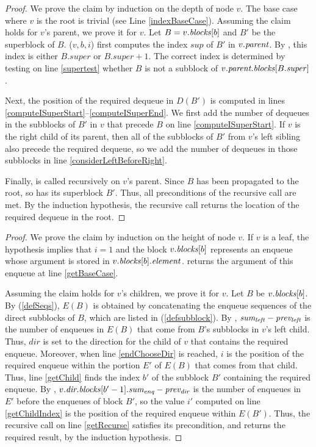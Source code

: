 \indexDequeueRes*
\begin{proof}
We prove the claim by induction on the depth of node $v$. The base case where $v$ is the root is trivial (see Line \ref{indexBaseCase}).
Assuming the claim holds for $v$'s parent, we prove it for $v$.
Let $B=v.\mbox{\textit{blocks}}[b]$ and $B'$ be the superblock of $B$.
($v, b, i$) first computes the index $sup$ of $B'$ in $v.\mbox{\textit{parent}}$.
By , this index is either $B.super$ or $B.super+1$.
The correct index is determined by testing on line \ref{supertest} whether $B$ is not a subblock of $v.\mbox{\textit{parent.blocks}}[B.\mbox{\textit{super}}]$.

Next, the position of the required dequeue in $D(B')$ is computed in 
lines \ref{computeISuperStart}--\ref{computeISuperEnd}. 
We first add the number of dequeues in the subblocks of $B'$ in $v$ that precede $B$ on line \ref{computeISuperStart}.
If $v$ is the right child of its parent, then all of the subblocks of $B'$ from $v$'s left sibling
also precede the required dequeue, so we add the number of dequeues in those subblocks in line \ref{considerLeftBeforeRight}.

Finally,  is called recursively on $v$'s parent.
Since $B$ has been propagated to the root, so has its superblock $B'$.
Thus, all preconditions of the recursive call are met.
By the induction hypothesis, the recursive call returns the location of the required dequeue in the root.\end{proof}

\getEnqRes*
\begin{proof}
We prove the claim by induction on the height of node $v$.
If $v$ is a leaf, the hypothesis implies that $i=1$ and the block $v.\mbox{\textit{blocks}}[b]$ represents 
an enqueue whose argument is stored in $v.\mbox{\textit{blocks}}[b].\mbox{\textit{element}}$.
 returns the argument of this enqueue at line \ref{getBaseCase}.

Assuming the claim holds for $v$'s children, we prove it for $v$.
Let $B$ be $v.\mbox{\textit{blocks}}[b]$.
By (\ref{defSeqs}),
$E(B)$ is obtained by concatenating the enqueue sequences of the direct subblocks
of $B$, which are listed in (\ref{defsubblock}).
By , $\mbox{\textnormal{\textit{sum\textsubscript{left}}}}-\mbox{\textnormal{\textit{prev\textsubscript{left}}}}$ is the number
of enqueues in $E(B)$ that come from $B$'s subblocks in $v$'s left child.
Thus, $dir$ is set to the direction for the child of $v$ that contains the required enqueue.
Moreover, when line \ref{endChooseDir} is reached, $i$ is the position of the required enqueue within the portion $E'$ of $E(B)$ that comes from that child.
Thus,  line \ref{getChild} finds the index $b'$ of the subblock $B'$ containing the required enqueue.
By , $v.\mbox{\textnormal{\textit{dir.blocks}}}[b'-1].\mbox{\textnormal{\textit{sum\textsubscript{enq}}}} - \mbox{\textnormal{\textit{prev\textsubscript{dir}}}}$ is the number of 
enqueues in $E'$ before the enqueues of block $B'$, so
the value $i'$ computed on line \ref{getChildIndex} is the position of the required enqueue within $E(B')$.
Thus, the recursive call on line \ref{getRecurse} satisfies its precondition, and 
returns the required result, by the induction hypothesis.
\end{proof}

